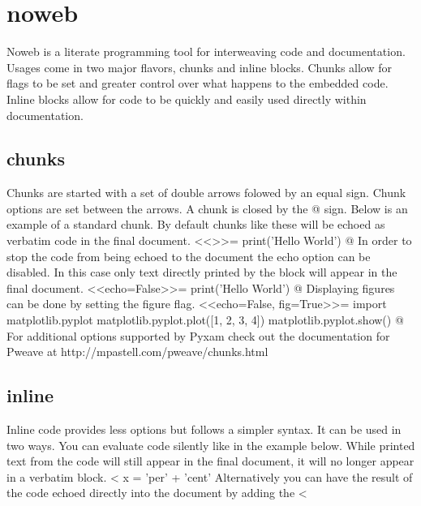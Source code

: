 \documentclass[12pt]{exam}
\begin{document}
    \section{noweb}
        Noweb is a literate programming tool for interweaving code and documentation. Usages come in two major flavors,
        chunks and inline blocks. Chunks allow for flags to be set and greater control over what happens to the embedded
        code. Inline blocks allow for code to be quickly and easily used directly within documentation.
        \subsection{chunks}
            Chunks are started with a set of double arrows folowed by an equal sign. Chunk options are set between the
            arrows. A chunk is closed by the @ sign. Below is an example of a standard chunk. By default chunks like
            these will be echoed as verbatim code in the final document.
<<>>=
print('Hello World')
@
            In order to stop the code from being echoed to the document the echo option can be disabled. In this case
            only text directly printed by the block will appear in the final document.
<<echo=False>>=
print('Hello World')
@
            Displaying figures can be done by setting the figure flag.
<<echo=False, fig=True>>=
import matplotlib.pyplot
matplotlib.pyplot.plot([1, 2, 3, 4])
matplotlib.pyplot.show()
@
            For additional options supported by Pyxam check out the documentation for Pweave at
            http://mpastell.com/pweave/chunks.html
        \subsection{inline}
            Inline code provides less options but follows a simpler syntax. It can be used in two ways. You can
            evaluate code silently like in the example below. While printed text from the code will still appear in the
            final document, it will no longer appear in a verbatim block.
<%
x = 'per' + 'cent'
            Alternatively you can have the result of the code echoed directly into the document by adding the
            <%
\end{document}
